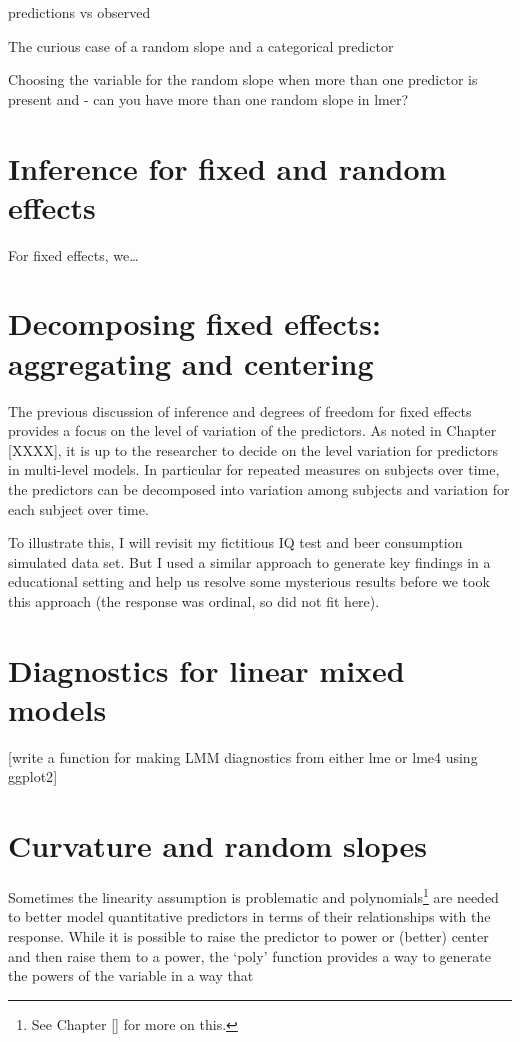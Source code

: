 \documentclass[
]{book}
\begin{document}
predictions vs observed

The curious case of a random slope and a categorical predictor

Choosing the variable for the random slope when more than one predictor is present and - can you have more than one random slope in lmer?

\hypertarget{section7-6}{%
\section{Inference for fixed and random effects}\label{section7-6}}

For fixed effects, we\ldots{}

\hypertarget{section7-7}{%
\section{Decomposing fixed effects: aggregating and centering}\label{section7-7}}

The previous discussion of inference and degrees of freedom for fixed effects provides a focus on the level of variation of the predictors. As noted in Chapter {[}XXXX{]}, it is up to the researcher to decide on the level variation for predictors in multi-level models. In particular for repeated measures on subjects over time, the predictors can be decomposed into variation among subjects and variation for each subject over time.

To illustrate this, I will revisit my fictitious IQ test and beer consumption simulated data set. But I used a similar approach to generate key findings in a educational setting and help us resolve some mysterious results before we took this approach (the response was ordinal, so did not fit here).

\hypertarget{section7-8}{%
\section{Diagnostics for linear mixed models}\label{section7-8}}

{[}write a function for making LMM diagnostics from either lme or lme4 using ggplot2{]}

\hypertarget{section7-9}{%
\section{Curvature and random slopes}\label{section7-9}}

\indent Sometimes the linearity assumption is problematic and polynomials\footnote{See Chapter {[}{]} for more on this.} are needed to better model quantitative predictors in terms of their relationships with the response. While it is possible to raise the predictor to power or (better) center and then raise them to a power, the `poly' function provides a way to generate the powers of the variable in a way that
\end{document}
